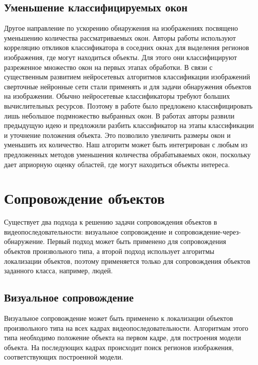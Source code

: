 \subsection{Уменьшение классифицируемых окон}

Другое направление по ускорению обнаружения на изображениях посвящено уменьшению количества рассматриваемых окон. Авторы работы \cite{dollar2012crosstalk} используют корреляцию откликов классификатора в соседних окнах для выделения регионов изображения, где могут находиться объекты. Для этого они классифицируют разреженное множество окон на первых этапах обработки. В связи с существенным развитием нейросетевых алгоритмов классификации изображений \cite{krizhevsky2012imagenet,simonyan2014very,he2015deep,szegedy2015rethinking} сверточные нейронные сети стали применять и для задачи обнаружения объектов на изображении. Обычно нейросетевые классификаторы требуют больших вычислительных ресурсов. Поэтому в работе \cite{girshick2014rich} было предложено классифицировать лишь небольшое подмножество выбранных окон. В работах \cite{girshick2015fast,ren2015faster} авторы развили предыдущую идею и предложили разбить классификатор на этапы классификации и уточнение положения объекта. Это позволило увеличить размеры окон и уменьшить их количество. Наш алгоритм может быть интегрирован с любым из предложенных методов уменьшения количества обрабатываемых окон, поскольку дает априорную оценку областей, где могут находиться объекты интереса.

\section{Сопровождение объектов}

Существует два подхода к решению задачи сопровождения объектов в видеопоследовательности: визуальное сопровождение и сопровождение-через-обнаружение. Первый подход может быть применено для сопровождения объектов произвольного типа, а второй подход использует алгоритмы локализации объектов, поэтому применяется только для сопровождения объектов заданного класса, например, людей.

\subsection{Визуальное сопровождение}

Визуальное сопровождение может быть применено к локализации объектов произвольного типа на всех кадрах видеопоследовательности. Алгоритмам этого типа необходимо положение объекта на первом кадре, для построения модели объекта. На последующих кадрах происходит поиск регионов изображения, соответствующих построенной модели.

